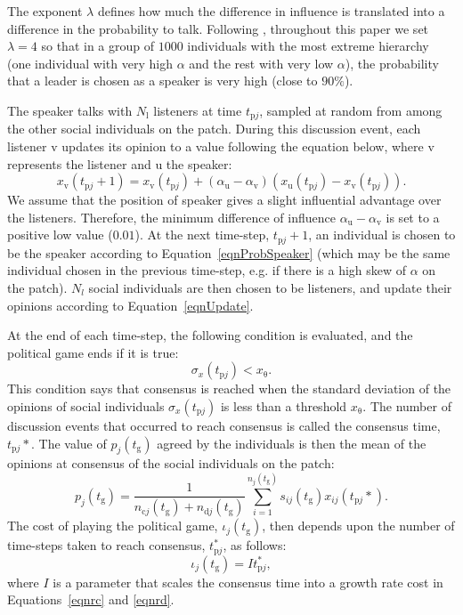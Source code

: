 \documentclass{rstb}
\begin{document}
\begin{linenumbers}
The exponent $\lambda$ defines how much the difference in influence is translated into a difference in the probability to talk. Following \cite{Perret:2020:a}, throughout this paper we set $\lambda = 4$ so that in a group of $1000$ individuals with the most extreme hierarchy (one individual with very high $\alpha$ and the rest with very low $\alpha$), the probability that a leader is chosen as a speaker is very high (close to $90\%$). 

The speaker talks with $N_\mathrm{l}$ listeners at time $t_{\mathrm{p}j}$, sampled at random from among the other social individuals on the patch. During this discussion event, each listener $\mathrm{v}$ updates its opinion to a value following the equation below, where $\mathrm{v}$ represents the listener and $\mathrm{u}$ the speaker:
\begin{equation}
x_\mathrm{v}(t_{\mathrm{p}j}+1) = x_\mathrm{v}(t_{\mathrm{p}j}) + (\alpha_\mathrm{u}-\alpha_\mathrm{v})(x_\mathrm{u}(t_{\mathrm{p}j}) - x_\mathrm{v}(t_{\mathrm{p}j})).
\label{eqnUpdate}
\end{equation}
We assume that the position of speaker gives a slight influential advantage over the listeners. Therefore, the minimum difference of influence $\alpha_\mathrm{u}-\alpha_\mathrm{v}$ is set to a positive low value ($0.01$). At the next time-step, $t_{\mathrm{p}j}+1$, an individual is chosen to be the speaker according to Equation~\ref{eqnProbSpeaker} (which may be the same individual chosen in the previous time-step, e.g. if there is a high skew of $\alpha$ on the patch). $N_l$ social individuals are then chosen to be listeners, and update their opinions according to Equation~\ref{eqnUpdate}. 


At the end of each time-step, the following condition is evaluated, and the political game ends if it is true:
\begin{equation}
    \sigma_x(t_{\mathrm{p}j}) < x_\mathrm{\theta}.
    \label{eqnConsensus}
\end{equation}
This condition says that consensus is reached when the standard deviation of the opinions of social individuals $\sigma_x(t_{\mathrm{p}j})$ is less than a threshold $x_\mathrm{\theta}$. The number of discussion events that occurred to reach consensus is called the consensus time, $t_{\mathrm{p}j}*$. The value of $p_j(t_\mathrm{g})$ agreed by the individuals is then the mean of the opinions at consensus of the social individuals on the patch:
\begin{equation}
    p_j(t_\mathrm{g}) = \frac{1}{n_{\mathrm{c}j}(t_\mathrm{g})+n_{\mathrm{d}j}(t_\mathrm{g})} \sum_{i=1}^{n_{j}(t_\mathrm{g})} s_{ij}(t_\mathrm{g})x_{ij}(t_{\mathrm{p}j}*).
    \label{eqnFinalP}
\end{equation}
The cost of playing the political game, $\iota_j(t_\mathrm{g})$, then depends upon the number of time-steps taken to reach consensus, $t_{\mathrm{p}j}^*$, as follows:
\begin{equation}
    \iota_j(t_\mathrm{g}) = I t_{\mathrm{p}j}^*,
    \label{eqnInstCost}
\end{equation}
where $I$ is a parameter that scales the consensus time into a growth rate cost in Equations~\ref{eqnrc} and \ref{eqnrd}.


\end{linenumbers}
\end{document}
